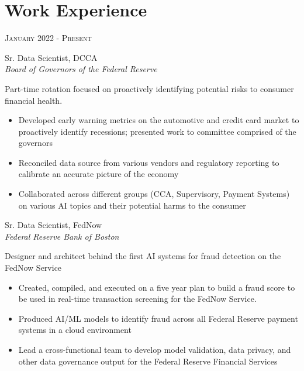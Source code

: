 \documentclass[10pt]{article} %
\begin{document}
\begin{minipage}[t]{0.5\textwidth} %
\vspace{0pt} %
	

\section{Work Experience} 

{\raggedleft\textsc{January 2022 - Present}\par}

{\raggedright\large Sr. Data Scientist,  DCCA\\ 
\textit{Board of Governors of the Federal Reserve}\\[5pt]}

\normalsize{Part-time rotation focused on proactively identifying potential risks to consumer financial health.   \\
\begin{itemize}
\item Developed early warning metrics on the automotive and credit card market to proactively identify recessions; presented work to committee comprised of the governors
\item Reconciled data source from various vendors and regulatory reporting to calibrate an accurate picture of the economy 
\item Collaborated across different groups (CCA, Supervisory, Payment Systems) on various AI topics and their potential harms to the consumer
\end{itemize}}

{\raggedright\large Sr. Data Scientist,  FedNow\\ 
\textit{Federal Reserve Bank of Boston}\\[5pt]}

\normalsize{Designer and architect behind the first AI systems for fraud detection on the FedNow Service     \\

\begin{itemize}
\item Created, compiled, and executed on a five year plan to build a fraud score to be used in real-time transaction screening for the FedNow Service. 
\item Produced AI/ML  models to identify fraud across all Federal Reserve payment systems in a cloud environment
\item Lead a cross-functional team to develop model validation, data privacy, and other data governance output for the Federal Reserve Financial Services
\end{itemize}}


\end{minipage}
\end{document}

